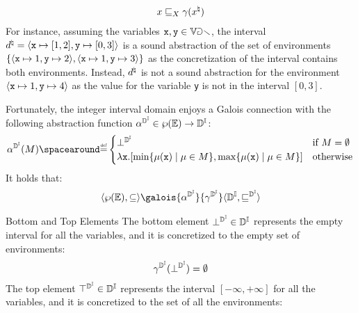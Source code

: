 \begin{description}
    \begin{align*}
      x \sqsubseteq_X \gamma(x^\natural)
    \end{align*}
    For instance, assuming the variables $\textup{\texttt{x}}, \texttt{y} \in \mathbb{Var}$, the interval $d^\natural = \langle \textup{\texttt{x}} \mapsto [1, 2], \texttt{y} \mapsto [0, 3] \rangle$ is a sound abstraction of the set of environments $\{\langle \textup{\texttt{x}}\mapsto 1, \texttt{y}\mapsto 2 \rangle, \langle \textup{\texttt{x}}\mapsto 1, \texttt{y}\mapsto 3 \rangle\}$ as the concretization of the interval contains both environments. Instead, $d^\natural$ is not a sound abstraction for the environment $\langle \textup{\texttt{x}}\mapsto 1, \texttt{y}\mapsto 4 \rangle$ as the value for the variable \texttt{y} is not in the interval $[0, 3]$.
    \item[Abstraction Function]
    Fortunately, the integer interval domain enjoys a Galois connection with the following abstraction function $\alpha^{\mathbb{D}^{\mathbb{I}}}\in\wp(\mathbb{E})\to\mathbb{D}^{\mathbb{I}}$:
    \begin{align*}
      \intervalabstractdomainabstraction(\defsetofenvs) \DefeQ \begin{cases}
        \intervalabstractdomainbottom & \text{if } \defsetofenvs = \emptyset \\
        \lambda \defvariable.\interval{\min\setdef{\defenv(\defvariable)}{\defenv\in\defsetofenvs}}{\max\setdef{\defenv(\defvariable)}{\defenv\in\defsetofenvs}} & \text{otherwise}
      \end{cases}
    \end{align*}
    It holds that:
  \begin{align*}
    \tuple{\setof{\env}}{\subseteq} \galois{\intervalabstractdomainabstraction}{\intervalabstractdomainconcretization}\tuple{\intervalabstractdomaintype}{\intervalabstractdomainsubseteq}
  \end{align*}
  \item{Bottom and Top Elements}
  The bottom element $\bot^{\mathbb{D}^{\mathbb{I}}}\in\mathbb{D}^{\mathbb{I}}$ represents the empty interval for all the variables, and it is concretized to the empty set of environments:
  \begin{align*}
    \gamma^{\mathbb{D}^{\mathbb{I}}}(\bot^{\mathbb{D}^{\mathbb{I}}}) = \emptyset
  \end{align*}
  The top element $\top^{\mathbb{D}^{\mathbb{I}}}\in\mathbb{D}^{\mathbb{I}}$ represents the interval $[-\infty, +\infty]$ for all the variables, and it is concretized to the set of all the environments:

\end{description}
